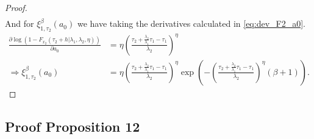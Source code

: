 \documentclass{article}
\begin{document}
\begin{proof}
\begin{align*}
\end{align*}
And for $\xi_{1,\tau_2}^{\beta}(a_0)$ we have taking the derivatives calculated in \eqref{eq:dev_F2_a0}.
\begin{align*}
\frac{\partial \log\left(1-F_{x_2}(\tau_2+h|\lambda_1,\lambda_2,\eta)\right)}{\partial a_0}&=\eta\left(\frac{\tau_2+\frac{\lambda_2}{\lambda_1}\tau_1-\tau_1}{\lambda_2}\right)^{\eta}
\\
\Rightarrow  \xi_{1,\tau_2}^{\beta}(a_0)&=\eta \left(\frac{\tau_2+\frac{\lambda_2}{\lambda_1}\tau_1-\tau_1}{\lambda_2}\right)^{\eta} \exp\left(-\left(\frac{\tau_2+\frac{\lambda_2}{\lambda_1}\tau_1-\tau_1}{\lambda_2}\right)^{\eta}(\beta+1)\right).
\end{align*}
\end{proof}

\subsection{Proof Proposition 12}
\end{document}
